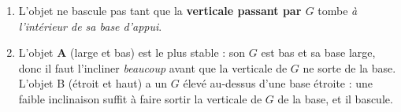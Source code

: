 \documentclass[11pt,a4paper]{article}
\begin{document}
\begin{corrige}
\begin{enumerate}[label=\alph*)]
  \item L'objet ne bascule pas tant que la \textbf{verticale passant par $G$} tombe \emph{à l'intérieur
        de sa base d'appui}.
  \item L'objet \textbf{A} (large et bas) est le plus stable : son $G$ est bas et sa base large, donc il
        faut l'incliner \emph{beaucoup} avant que la verticale de $G$ ne sorte de la base. L'objet B
        (étroit et haut) a un $G$ élevé au-dessus d'une base étroite : une faible inclinaison suffit à
        faire sortir la verticale de $G$ de la base, et il bascule.
\end{enumerate}
\end{corrige}
\end{document}
